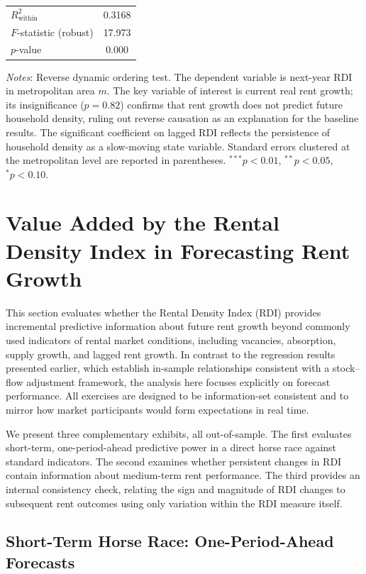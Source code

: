 \documentclass[pdflatex,sn-basic]{sn-jnl}%
\theoremstyle{thmstyleone}%
\theoremstyle{thmstyletwo}%
\theoremstyle{thmstylethree}%
\begin{document}
\begin{table}[htbp]
\begin{tabular}{lc}
$R^2_{\text{within}}$                   & 0.3168 \\
$F$-statistic (robust)                  & 17.973 \\
$p$-value                               & 0.000 \\
\bottomrule
\end{tabular}
\begin{flushleft}
\footnotesize
\textit{Notes}: Reverse dynamic ordering test. The dependent variable is 
next-year RDI in metropolitan area $m$. The key variable of interest is current 
real rent growth; its insignificance ($p = 0.82$) confirms that rent growth does 
not predict future household density, ruling out reverse causation as an 
explanation for the baseline results. The significant coefficient on lagged RDI 
reflects the persistence of household density as a slow-moving state variable. 
Standard errors clustered at the metropolitan level are reported in parentheses. 
$^{***}p<0.01$, $^{**}p<0.05$, $^{*}p<0.10$.
\end{flushleft}
\end{table}
\section{Value Added by the Rental Density Index in Forecasting Rent Growth}\label{section5}

This section evaluates whether the Rental Density Index (RDI) provides incremental predictive information about future rent growth beyond commonly used indicators of rental market conditions, including vacancies, absorption, supply growth, and lagged rent growth. In contrast to the regression results presented earlier, which establish in-sample relationships consistent with a stock–flow adjustment framework, the analysis here focuses explicitly on forecast performance. All exercises are designed to be information-set consistent and to mirror how market participants would form expectations in real time.

We present three complementary exhibits, all out-of-sample. The first evaluates short-term, one-period-ahead predictive power in a direct horse race against standard indicators. The second examines whether persistent changes in RDI contain information about medium-term rent performance. The third provides an internal consistency check, relating the sign and magnitude of RDI changes to subsequent rent outcomes using only variation within the RDI measure itself.
\subsection{Short-Term Horse Race: One-Period-Ahead Forecasts}
\end{document}
